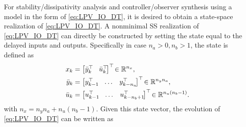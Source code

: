 For stability/dissipativity analysis and controller/observer synthesis using a model in the form of \eqref{eq:LPV_IO_DT}, it is desired to obtain a state-space realization of \eqref{eq:LPV_IO_DT}. A nonminimal SS realization of \eqref{eq:LPV_IO_DT} can directly be constructed by setting the state equal to the delayed inputs and outputs. Specifically in case $n_a > 0, n_b > 1$, the state is defined as
\begin{subequations}
 \label{eq:maximum_ss_state_def}
 \begin{align}
    x_k &= \begin{bmatrix} \bar{y}_k^\T & \bar{u}_k^\T \end{bmatrix}^\T \in \mathbb{R}^{n_x}, \\
    \bar{y}_k &= \begin{bmatrix} y_{k-1}^\T & \hdots & y_{k-n_a}^\T \end{bmatrix}^\T \in \mathbb{R}^{n_y n_a}, \\
    \bar{u}_k &= \begin{bmatrix} u_{k-1}^\T & \hdots & u_{k-n_b+1}^\T \end{bmatrix}^\T \in \mathbb{R}^{n_u (n_b-1)}.
\end{align}
\end{subequations}
with $n_x = n_y n_a + n_u (n_b -1)$. Given this state vector, the evolution of \eqref{eq:LPV_IO_DT} can be written as
